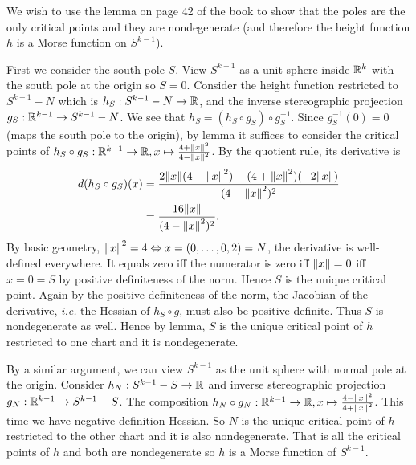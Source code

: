 \documentclass[12pt]{article}
\begin{document}
\begin{problem}[1.7.14]
We wish to use the lemma on page 42 of the book to show that the poles are the only critical points and they are nondegenerate (and therefore the height function $ h$ is a Morse function on $ S^{k-1}$). 

First we consider the south pole $ S$. View $ S^{k-1}$ as a unit sphere inside $ \mathbb{R}^{k}$ with the south pole at the origin so $ S=0$. Consider the height function restricted to $ S^{k-1} - N$ which is $ h_S: S^{k-1}-N \to \mathbb{R}$, and the inverse stereographic projection $ g_S: \mathbb{R}^{k-1} \to S^{k-1}-N$. We see that $ h_S=(h_S \circ g_S) \circ g_S^{-1}$. Since $ g_S^{-1}(0)=0$ (maps the south pole to the origin), by lemma it suffices to consider the critical points of $ h_S \circ g_S: \mathbb{R}^{k-1} \to \mathbb{R}, x \mapsto \frac{4+ {\left\lVert{ x}\right\rVert}^2 }{4- {\left\lVert{ x}\right\rVert}^2}$. By the quotient rule, its derivative is
\begin{align*}
	d (h_S \circ g_S)(x) &= \frac{2{\left\lVert{ x}\right\rVert}(4- {\left\lVert{ x}\right\rVert}^2 ) - (4+ {\left\lVert{ x}\right\rVert}^2 )(-2 {\left\lVert{ x}\right\rVert} )}{(4- {\left\lVert{ x}\right\rVert}^2 )^2 }\\
	&= \frac{16 {\left\lVert{ x}\right\rVert} }{ (4- {\left\lVert{ x}\right\rVert}^2 )^2} .
\end{align*}
By basic geometry, $ {\left\lVert{ x}\right\rVert}^2 = 4 \Leftrightarrow x=(0,\ldots,0,2)=N$, the derivative is well-defined everywhere. It equals zero iff the numerator is zero iff $ {\left\lVert{ x}\right\rVert} =0$ iff $ x=0=S$ by positive definiteness of the norm. Hence  $ S$ is the unique critical point. Again by the positive definiteness of the norm, the Jacobian of the derivative, \emph{i.e.} the Hessian of $ h_S \circ g$, must also be positive definite. Thus $ S$ is nondegenerate as well. Hence by lemma, $ S$ is the unique critical point of  $ h$ restricted to one chart and it is nondegenerate.

By a similar argument, we can view $ S^{k-1}$ as the unit sphere with normal pole at the origin. Consider $ h_N:S^{k-1} -S \to \mathbb{R}$ and inverse stereographic projection $ g_N: \mathbb{R}^{k-1} \to S^{k-1} -S$. The composition $ h_N \circ g_N: \mathbb{R}^{k-1} \to \mathbb{R}, x \mapsto \frac{4- {\left\lVert{ x}\right\rVert}^2 }{4+ {\left\lVert{ x}\right\rVert}^2}$. This time we have negative definition Hessian. So $ N$ is the unique critical point of  $ h$ restricted to the other chart and it is also nondegenerate. That is all the critical points of  $ h$ and both are nondegenerate so  $ h$ is a Morse function of  $ S^{k-1}$.
\end{problem}
\end{document}
